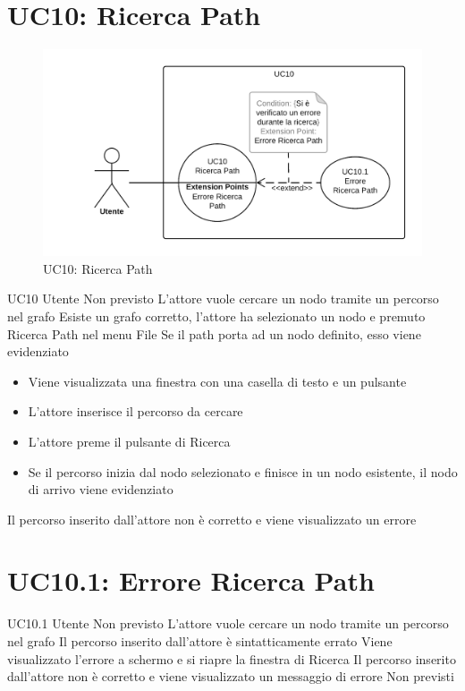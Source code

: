 \documentclass[../AnalisideiRequisiti.tex]{subfiles}
\begin{document}
\section{UC10: Ricerca Path}
\begin{figure}[H]
	\centering
	\includegraphics[width=\textwidth]{../img/UC10.png}
	\caption{UC10: Ricerca Path}
\end{figure}
\UserCase
{UC10}
{Utente}
{Non previsto}
{L'attore vuole cercare un nodo tramite un percorso nel grafo}
{Esiste un grafo corretto, l'attore ha selezionato un nodo e premuto Ricerca Path nel menu File}
{Se il path porta ad un nodo definito, esso viene evidenziato }
{
	\begin{itemize}
		\item{} Viene visualizzata una finestra con una casella di testo e un pulsante
		\item{} L'attore inserisce il percorso da cercare
		\item{} L'attore preme il pulsante di Ricerca
		\item{} Se il percorso inizia dal nodo selezionato e finisce in un nodo esistente, il nodo di arrivo viene evidenziato 
 	\end{itemize}
}
{Il percorso inserito dall'attore non è corretto e viene visualizzato un errore }

\section{UC10.1: Errore Ricerca Path}
\UserCase
{UC10.1}
{Utente}
{Non previsto}
{L'attore vuole cercare un nodo tramite un percorso nel grafo}
{Il percorso inserito dall'attore è sintatticamente errato}
{Viene visualizzato l'errore a schermo e si riapre la finestra di Ricerca }
{Il percorso inserito dall'attore non è corretto e viene visualizzato un messaggio di errore}
{Non previsti}
\end{document}
